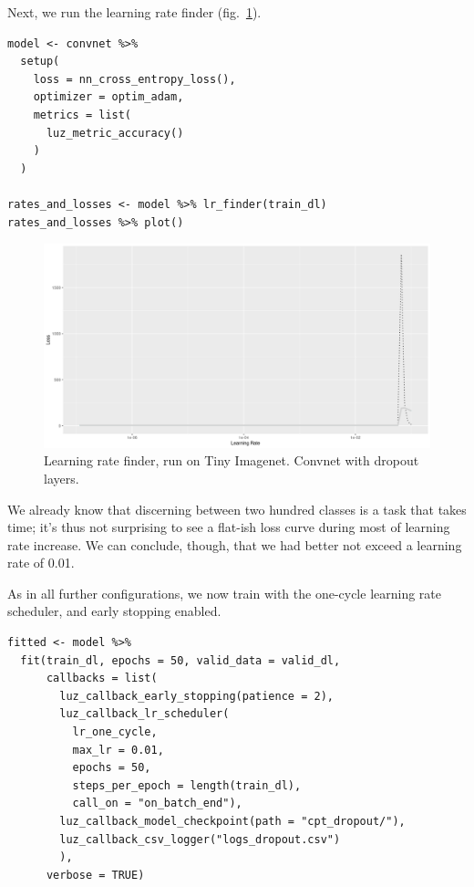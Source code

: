 \documentclass[
  letterpaper,
]{krantz}
\begin{document}
Next, we run the learning rate finder
(fig.~\ref{fig-images2-lr-finder-dropout}).

\begin{verbatim}
model <- convnet %>%
  setup(
    loss = nn_cross_entropy_loss(),
    optimizer = optim_adam,
    metrics = list(
      luz_metric_accuracy()
    )
  ) 
    
rates_and_losses <- model %>% lr_finder(train_dl)
rates_and_losses %>% plot()
\end{verbatim}

\begin{figure}[H]

{\centering \includegraphics{images/images2-lr-finder-dropout.png}

}

\caption{\label{fig-images2-lr-finder-dropout}Learning rate finder, run
on Tiny Imagenet. Convnet with dropout layers.}

\end{figure}

We already know that discerning between two hundred classes is a task
that takes time; it's thus not surprising to see a flat-ish loss curve
during most of learning rate increase. We can conclude, though, that we
had better not exceed a learning rate of 0.01.

As in all further configurations, we now train with the one-cycle
learning rate scheduler, and early stopping enabled.

\begin{verbatim}
fitted <- model %>%
  fit(train_dl, epochs = 50, valid_data = valid_dl,
      callbacks = list(
        luz_callback_early_stopping(patience = 2),
        luz_callback_lr_scheduler(
          lr_one_cycle,
          max_lr = 0.01,
          epochs = 50,
          steps_per_epoch = length(train_dl),
          call_on = "on_batch_end"),
        luz_callback_model_checkpoint(path = "cpt_dropout/"),
        luz_callback_csv_logger("logs_dropout.csv")
        ),
      verbose = TRUE)
\end{verbatim}
\end{document}
